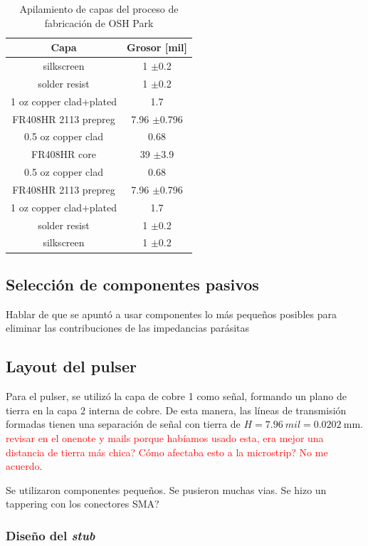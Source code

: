 \begin{table}[htbp]
\centering
\caption{Apilamiento de capas del proceso de fabricación de OSH Park}
\begin{tabular}{c|c}
Capa & Grosor [mil] \\
\hline
silkscreen & 1 $\pm$0.2 \\
solder resist & 1 $\pm$0.2 \\
1 oz copper clad+plated & 1.7 \\
FR408HR 2113 prepreg & 7.96 $\pm$0.796 \\
0.5 oz copper clad & 0.68 \\
FR408HR core & 39 $\pm$3.9 \\
0.5 oz copper clad & 0.68 \\
FR408HR 2113 prepreg & 7.96 $\pm$0.796 \\
1 oz copper clad+plated & 1.7 \\
solder resist & 1 $\pm$0.2 \\
silkscreen & 1 $\pm$0.2 \\
\end{tabular}
\label{tab:oshpark_4_layer_stackup}
\end{table}

\subsection{Selección de componentes pasivos}

Hablar de que se apuntó a usar componentes lo más pequeños posibles para
eliminar las contribuciones de las impedancias parásitas

\subsection{Layout del pulser}

Para el pulser, se utilizó la capa de cobre 1 como señal, formando un plano de
tierra en la capa 2 interna de cobre. De esta manera, las líneas de transmisión
formadas tienen una separación de señal con tierra de $H = 7.96 \ mil =
\qty{0.0202}{\milli\meter}$. \textcolor{red}{revisar en el onenote y mails
porque habíamos usado esta, era mejor una distancia de tierra más chica? Cómo
afectaba esto a la microstrip? No me acuerdo}.

Se utilizaron componentes pequeños. Se pusieron muchas vias. Se hizo un
tappering con los conectores SMA?

\subsubsection{Diseño del \textit{stub}}

